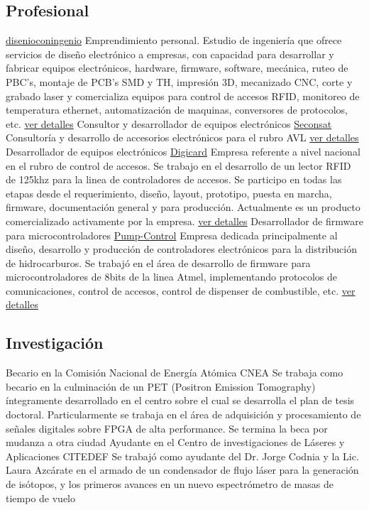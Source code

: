 \documentclass[11pt,a4paper,sans]{moderncv} 	%
\begin{document}
\subsection{Profesional}
	 			{\href{www.disenioconingenio.com.ar} 	{disenioconingenio}} 	{}{}{Emprendimiento personal. Estudio de ingeniería que ofrece servicios de diseño electrónico a empresas, con capacidad para desarrollar y fabricar equipos electrónicos, hardware, firmware, software, mecánica, ruteo de PBC's, montaje de PCB's SMD y TH, impresión 3D, mecanizado CNC, corte y grabado laser y comercializa equipos para control de accesos RFID, monitoreo de temperatura ethernet, automatización de maquinas, conversores de protocolos, etc. \href{http://disenioconingenio.com.ar/producto.php?products_id=398}{ver detalles}}
		{Consultor y desarrollador de equipos electrónicos} 	{\href{www.seconsat.com} 		{Seconsat}} 		{}{}{Consultoría y desarrollo de accesorios electrónicos para el rubro AVL \href{http://disenioconingenio.com.ar/producto.php?products_id=392}{ver detalles}}
	 	{Desarrollador de equipos electrónicos} 		{\href{www.digicard.com.ar} 		{Digicard}} 		{}{}{Empresa referente a nivel nacional en el rubro de control de accesos. Se trabajo en el desarrollo de un lector RFID de 125khz para la linea de controladores de accesos. Se participo en todas las etapas desde el requerimiento, diseño, layout, prototipo, puesta en marcha, firmware, documentación general y para producción. Actualmente es un producto comercializado activamente por la empresa. \href{http://disenioconingenio.com.ar/producto.php?products_id=393}{ver detalles}}
	 	{Desarrollador de firmware para microcontroladores} 	{\href{www.pump-control.com.ar} 	{Pump-Control}} 	{}{}{Empresa dedicada principalmente al diseño, desarrollo y producción de controladores electrónicos para la distribución de hidrocarburos. Se trabajó en el área de desarrollo de firmware para microcontroladores de 8bits de la linea Atmel, implementando protocolos de comunicaciones, control de accesos, control de dispenser de combustible, etc. \href{http://disenioconingenio.com.ar/producto.php?products_id=391}{ver detalles}}

	\subsection{Investigación}
		{Becario en la Comisión Nacional de Energía Atómica} 			{CNEA} 		{}{}{Se trabaja como becario en la culminación de un PET (Positron Emission Tomography) íntegramente desarrollado en el centro sobre el cual se desarrolla el plan de tesis doctoral. Particularmente se trabaja en el área de adquisición y procesamiento de señales digitales sobre FPGA de alta performance. Se termina la beca por mudanza a otra ciudad}
		{Ayudante en el Centro de investigaciones de Láseres y Aplicaciones} 	{CITEDEF} 	{}{}{Se trabajó como ayudante del Dr. Jorge Codnia y la Lic. Laura Azcárate en el armado de un condensador de flujo láser para la generación de isótopos, y los primeros avances en un nuevo espectrómetro de masas de tiempo de vuelo}
\end{document}
